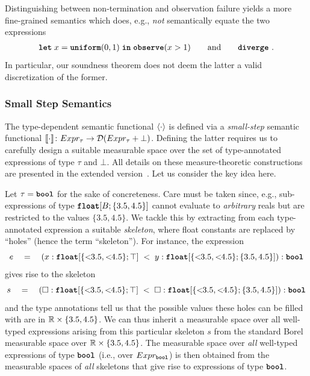 \begin{remark}
Distinguishing between non-termination and observation failure yields a more fine-grained semantics which does, e.g., \emph{not} semantically equate the two expressions 
%
\begin{align*}
 \textnormal{\ttfamily\bfseries let} \; x = \textnormal{\ttfamily\bfseries uniform}(0,1) \; \textnormal{\ttfamily\bfseries in} \; \textnormal{\ttfamily\bfseries observe}(x>1)
 \qquad\text{and}\qquad
 \textnormal{\ttfamily\bfseries diverge}~.
\end{align*}
%
In particular, our soundness theorem does not deem the latter a valid discretization of the former.
\end{remark}

\subsubsection{Small Step Semantics}
%
The type-dependent semantic functional $\langle \cdot \rangle$ is defined via a \emph{small-step} semantic functional $\llbracket \cdot \rrbracket\colon Expr_\tau \to \mathcal{D}(Expr_\tau + \bot)$. Defining the latter requires us to carefully design a suitable measurable space over the set of type-annotated expressions of type $\tau$ and $\bot$. All details on these measure-theoretic constructions are presented in the extended version~\cite[\S~F.2]{Wu2026SliceExtended}. Let us consider the key idea here.

Let $\tau=\textnormal{\ttfamily\bfseries bool}$ for the sake of concreteness. Care must be taken since, e.g., sub-expressions of type $\mathnormal{\textnormal{\ttfamily\bfseries float}}[B; \{3.5,4.5\}]$ cannot evaluate to \emph{arbitrary} reals but are restricted to the values $\{3.5,4.5\}$. We tackle this by extracting from each type-annotated expression a suitable \emph{skeleton}, where float constants are replaced by \enquote{holes} (hence the term \enquote{skeleton}). For instance, the expression
%
\[
	e \quad = \quad (x : \floattype{\{\clt{3.5}, \clt{4.5}\}}{\top}
	\;<\;
	y : \floattype{\{\clt{3.5}, \clt{4.5}\}}{\{3.5,4.5 \}})
	: \bool
\]
%
%
gives rise to the skeleton
%
\[
	s \quad = \quad (\square : \floattype{\{\clt{3.5}, \clt{4.5}\}}{\top}
	\;<\;
	\square : \floattype{\{\clt{3.5}, \clt{4.5}\}}{\{3.5,4.5 \}})
	: \bool
\]
%
and the type annotations tell us that the possible values these holes can be filled with are in $\mathbb{R} \times \{3.5,4.5 \}$. We can thus inherit a measurable space over all well-typed expressions arising from this particular skeleton $s$ from the standard Borel measurable space over $\mathbb{R} \times \{3.5,4.5 \}$. The measurable space over \emph{all} well-typed expressions of type $\textnormal{\ttfamily\bfseries bool}$ (i.e., over $Expr_{\textnormal{\ttfamily\bfseries bool}}$) is then obtained from the measurable spaces of \emph{all} skeletons that give rise to expressions of type $\textnormal{\ttfamily\bfseries bool}$.

